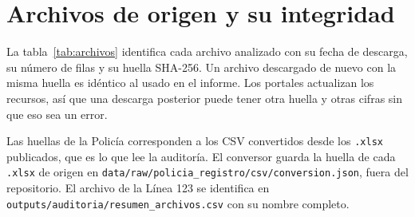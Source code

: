 \section{Archivos de origen y su integridad}\label{ap:archivos}

La tabla~\ref{tab:archivos} identifica cada archivo analizado con su fecha de descarga, su número de filas y su huella SHA-256. Un archivo descargado de nuevo con la misma huella es idéntico al usado en el informe. Los portales actualizan los recursos, así que una descarga posterior puede tener otra huella y otras cifras sin que eso sea un error.

Las huellas de la Policía corresponden a los CSV convertidos desde los \texttt{.xlsx} publicados, que es lo que lee la auditoría. El conversor guarda la huella de cada \texttt{.xlsx} de origen en \texttt{data/raw/policia\_\allowbreak{}registro/csv/conversion.json}, fuera del repositorio. El archivo de la Línea 123 se identifica en \texttt{outputs/auditoria/resumen\_\allowbreak{}archivos.csv} con su nombre completo.

